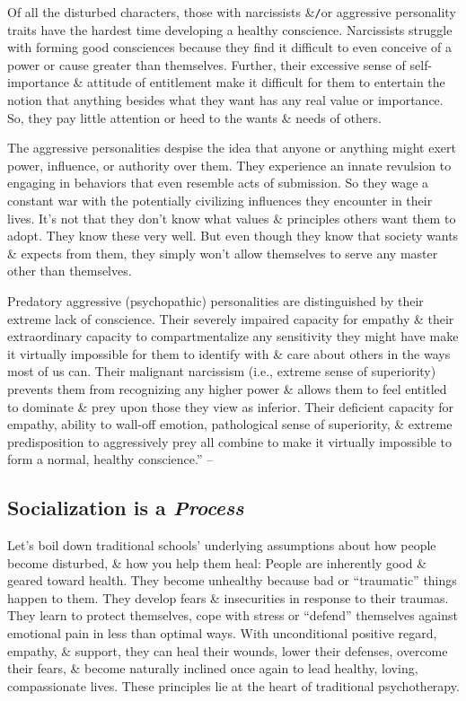 \documentclass{article}
\numberwithin{equation}{section}
\begin{document}
Of all the disturbed characters, those with narcissists \&\texttt{/}or aggressive personality traits have the hardest time developing a healthy conscience. Narcissists struggle with forming good consciences because they find it difficult to even conceive of a power or cause greater than themselves. Further, their excessive sense of self-importance \& attitude of entitlement make it difficult for them to entertain the notion that anything besides what they want has any real value or importance. So, they pay little attention or heed to the wants \& needs of others.

The aggressive personalities despise the idea that anyone or anything might exert power, influence, or authority over them. They experience an innate revulsion to engaging in behaviors that even resemble acts of submission. So they wage a constant war with the potentially civilizing influences they encounter in their lives. It's not that they don't know what values \& principles others want them to adopt. They know these very well. But even though they know that society wants \& expects from them, they simply won't allow themselves to serve any master other than themselves.

Predatory aggressive (psychopathic) personalities are distinguished by their extreme lack of conscience. Their severely impaired capacity for empathy \& their extraordinary capacity to compartmentalize any sensitivity they might have make it virtually impossible for them to identify with \& care about others in the ways most of us can. Their malignant narcissism (i.e., extreme sense of superiority) prevents them from recognizing any higher power \& allows them to feel entitled to dominate \& prey upon those they view as inferior. Their deficient capacity for empathy, ability to wall-off emotion, pathological sense of superiority, \& extreme predisposition to aggressively prey all combine to make it virtually impossible to form a normal, healthy conscience.'' -- \cite[pp. 125--126]{Simon2011}

\subsection{Socialization is a \textit{Process}}
Let's boil down traditional schools' underlying assumptions about how people become disturbed, \& how you help them heal: People are inherently good \& geared toward health. They become unhealthy because bad or ``traumatic'' things happen to them. They develop fears \& insecurities in response to their traumas. They learn to protect themselves, cope with stress or ``defend'' themselves against emotional pain in less than optimal ways. With unconditional positive regard, empathy, \& support, they can heal their wounds, lower their defenses, overcome their fears, \& become naturally inclined once again to lead healthy, loving, compassionate lives. These principles lie at the heart of traditional psychotherapy.
\end{document}
